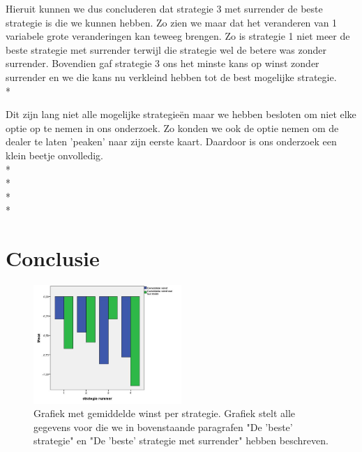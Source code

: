 \documentclass[conference]{IEEEtran}
\begin{document}
Hieruit kunnen we dus concluderen dat strategie 3 met surrender de beste strategie is die we kunnen hebben. Zo zien we maar dat het veranderen van 1 variabele grote veranderingen kan teweeg brengen. Zo is strategie 1 niet meer de beste strategie met surrender terwijl die strategie wel de betere was zonder surrender. Bovendien gaf strategie 3 ons het minste kans op winst zonder surrender en we die kans nu verkleind hebben tot de best mogelijke strategie.\\*

Dit zijn lang niet alle mogelijke strategie\"en maar we hebben besloten om niet elke optie op te nemen in ons onderzoek. Zo konden we ook de optie nemen om de dealer te laten 'peaken' naar zijn eerste kaart. Daardoor is ons onderzoek een klein beetje onvolledig.\\*\\*\\*\\*


\section{Conclusie}

\begin{figure}[h!]
	\centering
		\includegraphics[width=0.5\textwidth]{GrafiekProfit.jpeg}
	\caption{Grafiek met gemiddelde winst per strategie.
	Grafiek stelt alle gegevens voor die we in bovenstaande paragrafen "De 'beste' strategie" en "De 'beste' strategie met surrender" hebben beschreven.}
	\label{fig:GrafiekProfit}
\end{figure}
\end{document}
